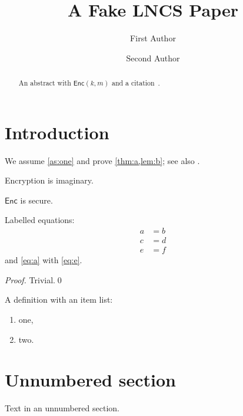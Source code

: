 \documentclass{llncs}
\newcommand{\Enc}{\mathsf{Enc}}
\begin{document}
\title{A Fake LNCS Paper}
\author{First Author \and Second Author}
\maketitle
\begin{abstract}
An abstract with $\Enc(k,m)$ and a citation~\cite{Lit1}.
\end{abstract}

\section{Introduction}
We assume \cref{as:one} and prove \cref{thm:a,lem:b}; see also \cite{Lit1,Lit2}.

\begin{assumption}\label{as:one}
Encryption is imaginary.
\end{assumption}

\begin{theorem}\label{thm:a}
$\Enc$ is secure.
\end{theorem}
\begin{lemma}[Helper]\label{lem:b}
Labelled equations:
\begin{align}
  a &= b \label{eq:a}\\
  c &= d \nonumber\\
  e &= f \label{eq:e}
\end{align}
and \eqref{eq:a} with \eqref{eq:e}.
\end{lemma}
\begin{proof}
Trivial.\qed
\end{proof}
\begin{definition}
A definition with an item list:
\begin{enumerate}
\item one, \item two.
\end{enumerate}
\end{definition}

\section*{Unnumbered section}
Text in an unnumbered section.

\printbibliography
\end{document}
